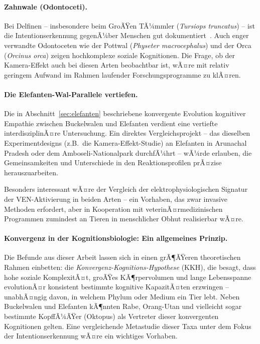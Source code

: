 ﻿\documentclass[12pt,a4paper]{article}
\theoremstyle{definition}
\theoremstyle{remark}
\begin{document}
\paragraph{Zahnwale (Odontoceti).}
Bei Delfinen -- insbesondere beim GroÃŸen TÃ¼mmler (\textit{Tursiops truncatus}) -- ist die Intentionserkennung gegenÃ¼ber Menschen gut dokumentiert~\cite{miklosi2004dogs}. Auch enger verwandte Odontoceten wie der Pottwal (\textit{Physeter macrocephalus}) und der Orca (\textit{Orcinus orca}) zeigen hochkomplexe soziale Kognitionen. Die Frage, ob der Kamera-Effekt auch bei diesen Arten beobachtbar ist, wÃ¤re mit relativ geringem Aufwand im Rahmen laufender Forschungsprogramme zu klÃ¤ren.

\paragraph{Die Elefanten-Wal-Parallele vertiefen.}
Die in Abschnitt~\ref{sec:elefanten} beschriebene konvergente Evolution kognitiver Empathie zwischen Buckelwalen und Elefanten verdient eine vertiefte interdisziplinÃ¤re Untersuchung. Ein direktes Vergleichsprojekt -- das dieselben Experimentdesigns (z.B.\ die Kamera-Effekt-Studie) an Elefanten in Arunachal Pradesh oder dem Amboseli-Nationalpark durchfÃ¼hrt -- wÃ¼rde erlauben, die Gemeinsamkeiten und Unterschiede in den Reaktionsprofilen prÃ¤zise herauszuarbeiten.

Besonders interessant wÃ¤re der Vergleich der elektrophysiologischen Signatur der VEN-Aktivierung in beiden Arten -- ein Vorhaben, das zwar invasive Methoden erfordert, aber in Kooperation mit veterinÃ¤rmedizinischen Programmen zumindest an Tieren in menschlicher Obhut realisierbar wÃ¤re.

\paragraph{Konvergenz in der Kognitionsbiologie: Ein allgemeines Prinzip.}
Die Befunde aus dieser Arbeit lassen sich in einen grÃ¶ÃŸeren theoretischen Rahmen einbetten: die \emph{Konvergenz-Kognitions-Hypothese} (KKH), die besagt, dass hohe soziale KomplexitÃ¤t, groÃŸes KÃ¶rpervolumen und lange Lebensspanne evolutionÃ¤r konsistent bestimmte kognitive KapazitÃ¤ten erzwingen -- unabhÃ¤ngig davon, in welchem Phylum oder Medium ein Tier lebt. Neben Buckelwalen und Elefanten kÃ¶nnten Rabe, Orang-Utan und vielleicht sogar bestimmte KopffÃ¼ÃŸer (Oktopus) als Vertreter dieser konvergenten Kognitionen gelten. Eine vergleichende Metastudie dieser Taxa unter dem Fokus der Intentionserkennung wÃ¤re ein wichtiges Vorhaben.
\end{document}
